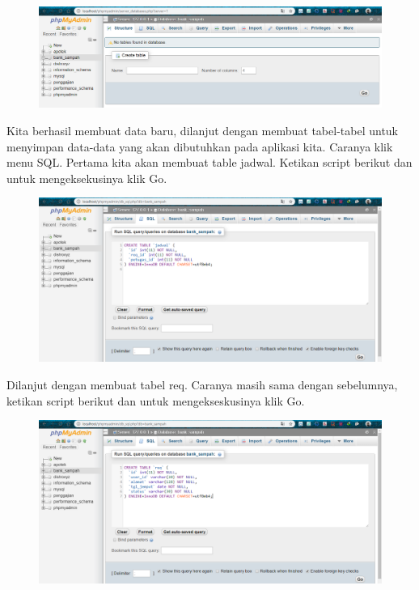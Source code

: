 \begin{figure}[H]
\centering
\includegraphics[width=1\textwidth]{figures/database/3.png}
\end{figure}

\noindent
Kita berhasil membuat data baru, dilanjut dengan membuat tabel-tabel untuk menyimpan data-data yang akan dibutuhkan pada aplikasi kita. Caranya klik menu SQL. Pertama kita akan membuat table jadwal. Ketikan script berikut dan untuk mengeksekusinya klik Go.



\begin{figure}[H]
\centering
\includegraphics[width=1\textwidth]{figures/database/4.png}
\end{figure}

\noindent
Dilanjut dengan membuat tabel req. Caranya masih sama dengan sebelumnya, ketikan script berikut dan untuk mengekseskusinya klik Go.



\begin{figure}[H]
\centering
\includegraphics[width=1\textwidth]{figures/database/5.png}
\end{figure}

